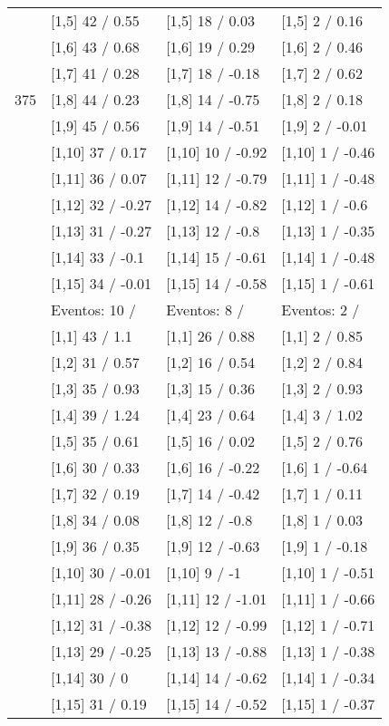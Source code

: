 \begin{table}
\begin{tabular}[t]{llll}
 & {}[1,5] 42  / 0.55 & {}[1,5] 18  / 0.03 & {}[1,5] 2  / 0.16\\
 & {}[1,6] 43  / 0.68 & {}[1,6] 19  / 0.29 & {}[1,6] 2  / 0.46\\
 & {}[1,7] 41  / 0.28 & {}[1,7] 18  / -0.18 & {}[1,7] 2  / 0.62\\
375 & {}[1,8] 44  / 0.23 & {}[1,8] 14  / -0.75 & {}[1,8] 2  / 0.18\\
\addlinespace
 & {}[1,9] 45  / 0.56 & {}[1,9] 14  / -0.51 & {}[1,9] 2  / -0.01\\
 & {}[1,10] 37  / 0.17 & {}[1,10] 10  / -0.92 & {}[1,10] 1  / -0.46\\
 & {}[1,11] 36  / 0.07 & {}[1,11] 12  / -0.79 & {}[1,11] 1  / -0.48\\
 & {}[1,12] 32  / -0.27 & {}[1,12] 14  / -0.82 & {}[1,12] 1  / -0.6\\
 & {}[1,13] 31  / -0.27 & {}[1,13] 12  / -0.8 & {}[1,13] 1  / -0.35\\
\addlinespace
 & {}[1,14] 33  / -0.1 & {}[1,14] 15  / -0.61 & {}[1,14] 1  / -0.48\\
 & {}[1,15] 34  / -0.01 & {}[1,15] 14  / -0.58 & {}[1,15] 1  / -0.61\\
 & Eventos:  10 / & Eventos:  8 / & Eventos:  2 /\\
 & {}[1,1] 43  / 1.1 & {}[1,1] 26  / 0.88 & {}[1,1] 2  / 0.85\\
 & {}[1,2] 31  / 0.57 & {}[1,2] 16  / 0.54 & {}[1,2] 2  / 0.84\\
\addlinespace
 & {}[1,3] 35  / 0.93 & {}[1,3] 15  / 0.36 & {}[1,3] 2  / 0.93\\
 & {}[1,4] 39  / 1.24 & {}[1,4] 23  / 0.64 & {}[1,4] 3  / 1.02\\
 & {}[1,5] 35  / 0.61 & {}[1,5] 16  / 0.02 & {}[1,5] 2  / 0.76\\
 & {}[1,6] 30  / 0.33 & {}[1,6] 16  / -0.22 & {}[1,6] 1  / -0.64\\
 & {}[1,7] 32  / 0.19 & {}[1,7] 14  / -0.42 & {}[1,7] 1  / 0.11\\
\addlinespace
500 & {}[1,8] 34  / 0.08 & {}[1,8] 12  / -0.8 & {}[1,8] 1  / 0.03\\
 & {}[1,9] 36  / 0.35 & {}[1,9] 12  / -0.63 & {}[1,9] 1  / -0.18\\
 & {}[1,10] 30  / -0.01 & {}[1,10] 9  / -1 & {}[1,10] 1  / -0.51\\
 & {}[1,11] 28  / -0.26 & {}[1,11] 12  / -1.01 & {}[1,11] 1  / -0.66\\
 & {}[1,12] 31  / -0.38 & {}[1,12] 12  / -0.99 & {}[1,12] 1  / -0.71\\
\addlinespace
 & {}[1,13] 29  / -0.25 & {}[1,13] 13  / -0.88 & {}[1,13] 1  / -0.38\\
 & {}[1,14] 30  / 0 & {}[1,14] 14  / -0.62 & {}[1,14] 1  / -0.34\\
 & {}[1,15] 31  / 0.19 & {}[1,15] 14  / -0.52 & {}[1,15] 1  / -0.37\\
\bottomrule
\end{tabular}
\end{table}
